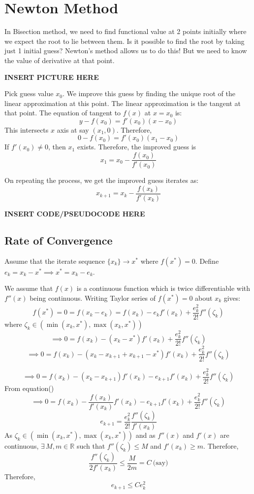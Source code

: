 \documentclass[
]{book}
\begin{document}
\hypertarget{newton-method}{%
\section{Newton Method}\label{newton-method}}

In Bisection method, we need to find functional value at 2 points initially where we expect the root to lie between them. Is it possible to find the root by taking just 1 initial guess? Newton's method allows us to do this! But we need to know the value of derivative at that point.

\textbf{INSERT PICTURE HERE}

Pick guess value \(x_0\). We improve this guess by finding the unique root of the linear approximation at this point. The linear approximation is the tangent at that point. The equation of tangent to \(f(x)\) at \(x=x_0\) is:
\[y-f(x_0) = f'(x_0) (x-x_0)\]
This intersects \(x\) axis at say \((x_1,0)\). Therefore,
\[0-f(x_0) =  f'(x_0) (x_1-x_0)\]
If \(f'(x_0)\neq 0\), then \(x_1\) exists. Therefore, the improved guess is
\begin{equation}
x_1 = x_0 - \frac{f(x_0)}{f'(x_0)}
\end{equation}

On repeating the process, we get the improved guess iterates as:
\begin{equation}
x_{k+1} = x_k - \frac{f(x_k)}{f'(x_k)}
\end{equation}

\textbf{INSERT CODE/PSEUDOCODE HERE}

\hypertarget{rate-of-convergence}{%
\subsection{Rate of Convergence}\label{rate-of-convergence}}

Assume that the iterate sequence \(\{x_k\}\to x^*\) where \(f(x^*)=0\).
Define \(e_k = x_k-x^* \implies x^*=x_k-e_k\).

We assume that \(f(x)\) is a continuous function which is twice differentiable with \(f''(x)\) being continuous. Writing Taylor series of \(f(x^*)=0\) about \(x_k\) gives:
\[f(x^*)=0= f(x_k-e_k) = f(x_k) - e_k f'(x_k)+\frac{e_k^2}{2!} f''(\zeta_k) \]
where \(\zeta_k \in (\min(x_k,x^*),\max(x_k,x^*))\)
\[\implies 0=f(x_k)-(x_k-x^*)f'(x_k)+\frac{e_k^2}{2!} f''(\zeta_k)\]
\[\implies 0 = f(x_k) - (x_k-x_{k+1}+x_{k+1}-x^*)f'(x_k) + \frac{e_k^2}{2!} f''(\zeta_k)\]

\[\implies 0 = f(x_k) - (x_k-x_{k+1}) f'(x_k) - e_{k+1} f'(x_k) +\frac{e_k^2}{2!} f''(\zeta_k)\]
From equation()
\[\implies 0 =f(x_k) - \frac{f(x_k)}{f'(x_k)}f'(x_k) - e_{k+1} f'(x_k) +\frac{e_k^2}{2!} f''(\zeta_k)\]
\[ e_{k+1} = \frac{e_k^2}{2!} \frac{f''(\zeta_k)}{f'(x_k)}\]
As \(\zeta_k \in (\min(x_k,x^*),\max(x_k,x^*))\) and as \(f''(x)\) and \(f'(x)\) are continuous, \(\exists\, M,m\in \mathbb{R}\) such that \(f''(\zeta_k) \le M\) and \(f'(x_k) \ge m\). Therefore,
\[\frac{f''(\zeta_k)}{2 f'(x_k)} \le \frac{M}{2m} = C \ \text{(say)}\]
Therefore,
\begin{equation}
e_{k+1} \le C e_k^2
\end{equation}
\end{document}
